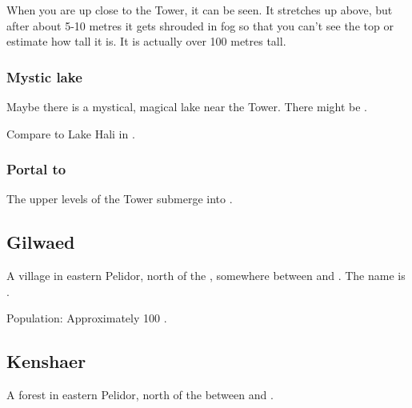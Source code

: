 When you are up close to the Tower, it can be seen. 
It stretches up above, but after about 5-10 metres it gets shrouded in fog so that you can't see the top or estimate how tall it is. 
It is actually over 100 metres tall. 





\subsubsection{Mystic lake}
Maybe there is a mystical, magical lake near the Tower. 
There might be .

Compare to Lake Hali in \RWCTKIY. 





\subsubsection{Portal to \Nyx}
The upper levels of the Tower submerge into \Nyx. 











\subsection{Gilwaed}
A village in eastern Pelidor, north of the , somewhere between  and . 
The name is \Tepharin. 

Population: Approximately 100 \scathae. 











\subsection{Kenshaer}
A  forest in eastern Pelidor, north of the  between \Forclin{} and . 









